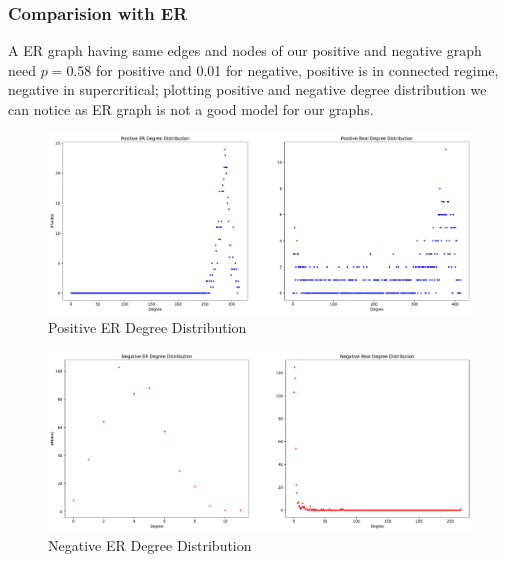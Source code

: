 \documentclass[sigchi]{acmart}
\begin{document}
\subsubsection{Comparision with ER}
A ER graph having same edges and nodes of our positive and negative graph need $p = 0.58$ for positive and 0.01 for negative, positive is in  connected regime, negative in supercritical; plotting positive and negative degree distribution we can notice as ER graph is not a good model for our graphs.
\begin{figure}[h]
	\centering
	\includegraphics[width=\linewidth]{plot/er_comparison_positive.pdf}
	\caption{Positive ER Degree Distribution}
\end{figure}
\begin{figure}[h]
	\centering
	\includegraphics[width=\linewidth]{plot/er_comparison_negative.pdf}
	\caption{Negative ER Degree Distribution}
\end{figure}
\end{document}
